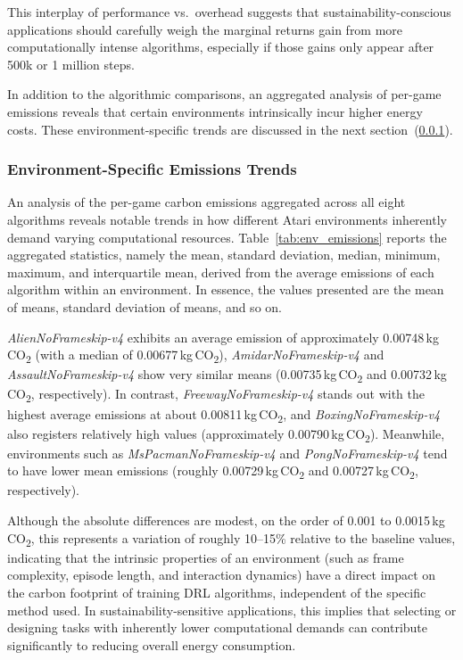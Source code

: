 This interplay of performance vs.\ overhead suggests that sustainability-conscious 
applications should carefully weigh the marginal returns gain from more computationally 
intense algorithms, especially if those gains only appear after 500k or 1 million steps.

In addition to the algorithmic comparisons, an aggregated analysis of per-game emissions reveals that certain environments intrinsically incur higher energy costs. These environment-specific trends are discussed in the next section~(\ref{subsubsec:environment_emissions}).

\subsubsection{Environment-Specific Emissions Trends}
\label{subsubsec:environment_emissions}
An analysis of the per-game carbon emissions aggregated across all eight algorithms reveals notable trends in how different Atari environments inherently demand varying computational resources. Table~\ref{tab:env_emissions} reports the aggregated statistics, namely the mean, standard deviation, median, minimum, maximum, and interquartile mean, derived from the average emissions of each algorithm within an environment. In essence, the values presented are the mean of means, standard deviation of means, and so on.

\emph{AlienNoFrameskip-v4} exhibits an average emission of approximately \num{0.00748}\,kg\,CO\textsubscript{2} (with a median of \num{0.00677}\,kg\,CO\textsubscript{2}), \emph{AmidarNoFrameskip-v4} and \emph{AssaultNoFrameskip-v4} show very similar means (\num{0.00735}\,kg\,CO\textsubscript{2} and \num{0.00732}\,kg\,CO\textsubscript{2}, respectively). In contrast, \emph{FreewayNoFrameskip-v4} stands out with the highest average emissions at about \num{0.00811}\,kg\,CO\textsubscript{2}, and \emph{BoxingNoFrameskip-v4} also registers relatively high values (approximately \num{0.00790}\,kg\,CO\textsubscript{2}). Meanwhile, environments such as \emph{MsPacmanNoFrameskip-v4} and \emph{PongNoFrameskip-v4} tend to have lower mean emissions (roughly \num{0.00729}\,kg\,CO\textsubscript{2} and \num{0.00727}\,kg\,CO\textsubscript{2}, respectively).

Although the absolute differences are modest, on the order of \num{0.001} to \num{0.0015}\,kg\,CO\textsubscript{2}, this represents a variation of roughly \num{10}–\num{15}\% relative to the baseline values, indicating that the intrinsic properties of an environment (such as frame complexity, episode length, and interaction dynamics) have a direct impact on the carbon footprint of training DRL algorithms, independent of the specific method used. In sustainability-sensitive applications, this implies that selecting or designing tasks with inherently lower computational demands can contribute significantly to reducing overall energy consumption.

